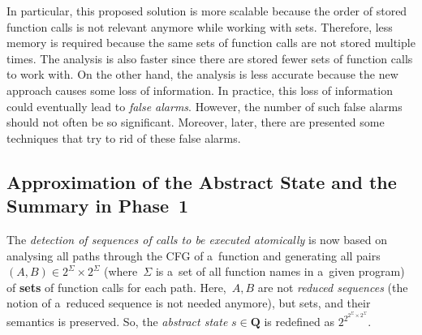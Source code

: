In particular, this proposed solution is more scalable because the order
of stored function calls is not relevant anymore while working with
sets. Therefore, less memory is required because the same sets of
function calls are not stored multiple times. The analysis is also faster
since there are stored fewer sets of function calls to work with. On the
other hand, the analysis is less accurate because the new approach
causes some loss of information. In practice, this loss of information
could eventually lead to \emph{false alarms}. However, the number of
such false alarms should not often be so significant. Moreover, later,
there are presented some techniques that try to rid of these false
alarms.

\subsection{%
    Approximation of the Abstract State and the Summary in Phase~1%
}

The \emph{detection of sequences of calls to be executed atomically} is now
based on analysing all paths through the CFG of a~function and generating
all pairs $ {(A, B)} \in 2^\Sigma \times 2^\Sigma $ (where~$ \Sigma $ is
a~set of all function names in a~given program) of \textbf{sets} of
function calls for each path. Here,~$ A, B $ are not \emph{reduced
sequences} (the notion of a~reduced sequence is not needed anymore), but sets,
and their semantics is preserved. So, the \emph{abstract state} $ s \in
\boldsymbol{Q} $ is redefined as $ 2^{2^{2^\Sigma \times 2^\Sigma}} $.

